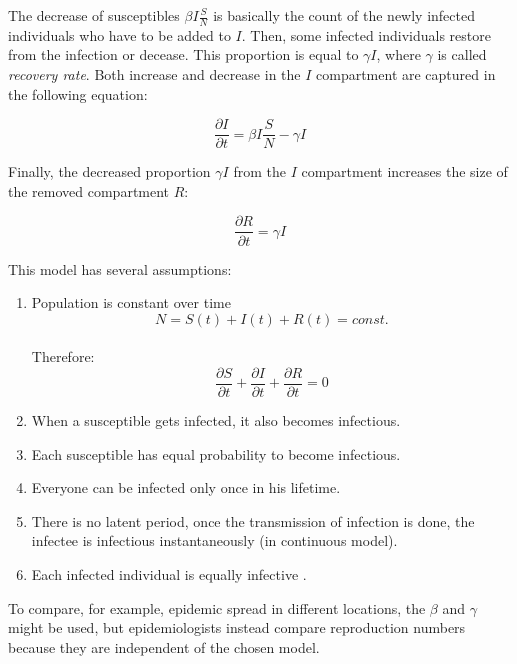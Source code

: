 \documentclass[
  digital, %
  oneside, %
  lof,     %
  lot,     %
]{fithesis4}
\begin{document}
The decrease of susceptibles $\beta I \frac{S}{N}$ is basically the count of the newly infected individuals who have to be added to $I$.
Then, some infected individuals restore from the infection or decease. 
This proportion is equal to $\gamma I$, where $\gamma$ is called \textit{recovery rate}. Both increase and decrease in the $I$ compartment are captured in the following equation:

\begin{equation}\label{eq:sir-model-partial-I}
	\frac{\partial{I}}{\partial{t}} = \beta I \frac{S}{N} - \gamma I
\end{equation}

Finally, the decreased proportion $\gamma I$ from the $I$ compartment increases the size of the removed compartment $R$:

\begin{equation}
	\frac{\partial{R}}{\partial{t}} = \gamma I
\end{equation}

This model has several assumptions:

\begin{enumerate}
  \item Population is constant over time \\
    \begin{equation}
      N = S(t) + I(t) + R(t) = const.
    \end{equation} \\
    Therefore: \\
    \begin{equation}
      \frac{\partial{S}}{\partial{t}} + \frac{\partial{I}}{\partial{t}} + \frac{\partial{R}}{\partial{t}} = 0
    \end{equation}
  \item When a susceptible gets infected, it also becomes infectious.
  \item Each susceptible has equal probability to become infectious.
  \item Everyone can be infected only once in his lifetime.
  \item There is no latent period, once the transmission of infection is done, the infectee is infectious instantaneously (in continuous model).
  \item Each infected individual is equally infective \cite{volz2018}.
\end{enumerate}

To compare, for example, epidemic spread in different locations, the $\beta$ and $\gamma$ might be used, but epidemiologists instead compare reproduction numbers because they are independent of the chosen model.
\end{document}
